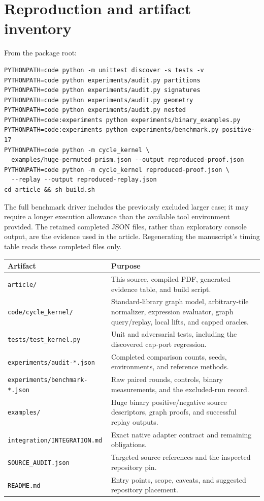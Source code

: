 \documentclass[11pt]{article}
\theoremstyle{remark}\newtheorem{remark}[theorem]{Remark}
\DeclareRobustCommand{\code}[1]{\nolinkurl{#1}}
\begin{document}
\section{Reproduction and artifact inventory}
From the package root:
\begin{verbatim}
PYTHONPATH=code python -m unittest discover -s tests -v
PYTHONPATH=code python experiments/audit.py partitions
PYTHONPATH=code python experiments/audit.py signatures
PYTHONPATH=code python experiments/audit.py geometry
PYTHONPATH=code python experiments/audit.py nested
PYTHONPATH=code:experiments python experiments/binary_examples.py
PYTHONPATH=code:experiments python experiments/benchmark.py positive-17
PYTHONPATH=code python -m cycle_kernel \
  examples/huge-permuted-prism.json --output reproduced-proof.json
PYTHONPATH=code python -m cycle_kernel reproduced-proof.json \
  --replay --output reproduced-replay.json
cd article && sh build.sh
\end{verbatim}
The full benchmark driver includes the previously excluded larger case; it may require a longer execution allowance than the available tool environment provided. The retained completed JSON files, rather than exploratory console output, are the evidence used in the article. Regenerating the manuscript's timing table reads these completed files only.

\begin{longtable}{p{.36\linewidth}p{.57\linewidth}}\toprule
Artifact & Purpose\\\midrule\endhead
\code{article/} & This source, compiled PDF, generated evidence table, and build script.\\
\code{code/cycle_kernel/} & Standard-library graph model, arbitrary-tile normalizer, expression evaluator, graph query/replay, local lifts, and capped oracles.\\
\code{tests/test_kernel.py} & Unit and adversarial tests, including the discovered cap-port regression.\\
\code{experiments/audit-*.json} & Completed comparison counts, seeds, environments, and reference methods.\\
\code{experiments/benchmark-*.json} & Raw paired rounds, controls, binary measurements, and the excluded-run record.\\
\code{examples/} & Huge binary positive/negative source descriptors, graph proofs, and successful replay outputs.\\
\code{integration/INTEGRATION.md} & Exact native adapter contract and remaining obligations.\\
\code{SOURCE_AUDIT.json} & Targeted source references and the inspected repository pin.\\
\code{README.md} & Entry points, scope, caveats, and suggested repository placement.\\\bottomrule
\end{longtable}
\end{document}
